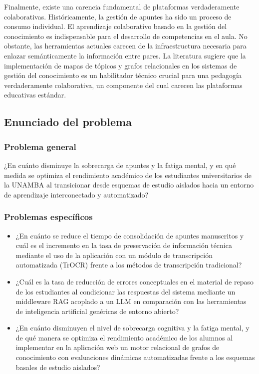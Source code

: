 Finalmente, existe una carencia fundamental de plataformas verdaderamente colaborativas. Históricamente, la gestión de apuntes ha sido un proceso de consumo individual. El aprendizaje colaborativo basado en la gestión del conocimiento es indispensable para el desarrollo de competencias en el aula. No obstante, las herramientas actuales carecen de la infraestructura necesaria para enlazar semánticamente la información entre pares. La literatura sugiere que la implementación de mapas de tópicos y grafos relacionales en los sistemas de gestión del conocimiento es un habilitador técnico crucial para una pedagogía verdaderamente colaborativa, un componente del cual carecen las plataformas educativas estándar.
\subsection{Enunciado del problema}

\subsubsection{Problema general}
¿En cuánto disminuye la sobrecarga de apuntes y la fatiga mental, y en qué medida se optimiza el rendimiento académico de los estudiantes universitarios de la UNAMBA al transicionar desde esquemas de estudio aislados hacia un entorno de aprendizaje interconectado y automatizado?

\subsubsection{Problemas específicos}
\begin{itemize}

\item  
¿En cuánto se reduce el tiempo de consolidación de apuntes manuscritos y cuál es el incremento en la tasa de preservación de información técnica mediante el uso de la aplicación con un módulo de transcripción automatizada (TrOCR) frente a los métodos de transcripción tradicional?

\item
¿Cuál es la tasa de reducción de errores conceptuales en el material de repaso de los estudiantes al condicionar las respuestas del sistema mediante un middleware RAG acoplado a un LLM en comparación con las herramientas de inteligencia artificial genéricas de entorno abierto?

\item
¿En cuánto disminuyen el nivel de sobrecarga cognitiva y la fatiga mental, y de qué manera se optimiza el rendimiento académico de los alumnos al implementar en la aplicación web un motor relacional de grafos de conocimiento con evaluaciones dinámicas automatizadas frente a los esquemas basales de estudio aislados?

\end{itemize}


